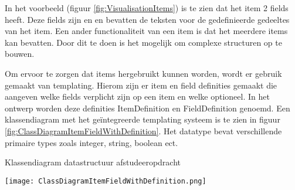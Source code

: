 \whitespace
In het voorbeeld (figuur \ref{fig:VisualisationItems}) is te zien dat het item  2 fields heeft.
Deze fields zijn  en  en bevatten de teksten voor de gedefinieerde gedeeltes van het item.
Een ander functionaliteit van een item is dat het meerdere items kan bevatten. 
Door dit te doen is het mogelijk om complexe structuren op te bouwen.

\whitespace
Om ervoor te zorgen dat items hergebruikt kunnen worden, wordt er gebruik gemaakt van templating.
Hierom zijn er item en field definities gemaakt die aangeven welke fields verplicht zijn op een item en welke optioneel.
In het ontwerp worden deze definities ItemDefinition en FieldDefinition genoemd.
Een klassendiagram met het geïntegreerde templating systeem is te zien in figuur \ref{fig:ClassDiagramItemFieldWithDefinition}.
Het datatype  bevat verschillende primaire types zoals integer, string, boolean ect.

\whitespace[2]
\begin{graphic}
    \captionsetup{type=figure}
    \caption{Klassendiagram datastructuur afstudeeropdracht}
    \texttt{[image: ClassDiagramItemFieldWithDefinition.png]}
    \label{fig:ClassDiagramItemFieldWithDefinition}
\end{graphic}


